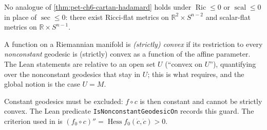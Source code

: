 \begin{remark}
  \label{rem:pet-ch6-cartan-hadamard-fails-ricci}


  No analogue of \cref{thm:pet-ch6-cartan-hadamard} holds under $\operatorname{Ric}\le0$
  or $\operatorname{scal}\le0$ in place of $\sec\le0$: there exist Ricci-flat metrics on
  $\mathbb{R}^2\times S^{n-2}$ and scalar-flat metrics on $\mathbb{R}\times S^{n-1}$.
\end{remark}

\begin{definition}
  \label{def:pet-ch6-convex-function}


  A function on a Riemannian manifold is \emph{(strictly) convex} if its
  restriction to every \emph{nonconstant} geodesic is (strictly) convex as a
  function of the affine parameter. The Lean statements are relative to an open
  set $U$ (``convex on $U$''), quantifying over the nonconstant geodesics that
  stay in $U$; this is what 
  requires, and the global notion is the case $U=M$.

  Constant geodesics must be excluded: $f\circ c$ is then constant and cannot
  be strictly convex. The Lean predicate \texttt{IsNonconstantGeodesicOn}
  records this guard. The criterion used in
   is
  $(f_0\circ c)''=\operatorname{Hess}f_0(\dot c,\dot c)>0$.
\end{definition}

